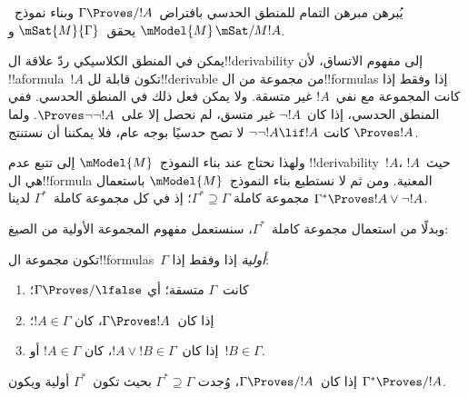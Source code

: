 \documentclass[../../../include/open-logic-section]{subfiles}
\begin{document}


يُبرهن مبرهن التمام للمنطق الحدسي بافتراض~$\Gamma \Proves/ !A$ وبناء
نموذج~$\mModel{M}$ يحقق~$\mSat{M}{\Gamma}$ و$\mSat/{M}{!A}$.

يمكن في المنطق الكلاسيكي ردّ علاقة ال!!{derivability} إلى مفهوم الاتساق،
لأن !!a{formula}~$!A$ تكون قابلة لل!!{derivable} من مجموعة من
ال!!{formula}s إذا وفقط إذا كانت المجموعة مع نفي~$!A$ غير متسقة. ولا
يمكن فعل ذلك في المنطق الحدسي. ففي المنطق الحدسي، إذا كان~$\lnot !A$
غير متسق، لم نحصل إلا على~$\Proves \lnot\lnot !A$. ولما كانت
$\lnot\lnot !A \lif !A$ لا تصح حدسيًا بوجه عام، فلا يمكننا أن نستنتج
$\Proves !A$.

ولهذا نحتاج عند بناء النموذج~$\mModel{M}$ إلى تتبع عدم
!!{derivability}~$!A$، حيث~$!A$ هي ال!!{formula} المعنية. ومن ثم لا نستطيع بناء
النموذج~$\mModel{M}$ باستعمال مجموعة كاملة
$\Gamma^* \supseteq \Gamma$؛ إذ في كل مجموعة كاملة~$\Gamma^*$ لدينا
$\Gamma^* \Proves !A \lor \lnot !A$.

وبدلًا من استعمال مجموعة كاملة~$\Gamma^*$، سنستعمل مفهوم المجموعة
الأولية من الصيغ:

\begin{defn}
  تكون مجموعة ال!!{formula}s~$\Gamma$ \emph{أولية} إذا وفقط إذا:
  \begin{enumerate}
  \item{} كانت~$\Gamma$ متسقة؛ أي
    $\Gamma \Proves/ \lfalse$؛
  \item{} إذا كان~$\Gamma \Proves !A$، كان
    $!A \in \Gamma$؛
  \item{} إذا كان~$!A \lor !B \in \Gamma$، كان
    $!A \in \Gamma$ أو~$!B \in \Gamma$.
  \end{enumerate}
\end{defn}

\begin{lem}[لمّة ليندنباوم]
   إذا كان~$\Gamma \Proves/ !A$، وُجدت
  $\Gamma^* \supseteq \Gamma$ بحيث تكون~$\Gamma^*$ أولية ويكون
  $\Gamma^* \Proves/ !A$.
\end{lem}
\end{document}
